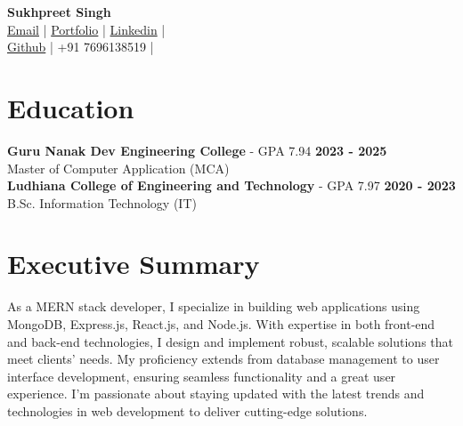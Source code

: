 \documentclass[letterpaper, 8pt]{article}
\newcommand{\iconSpace}{\hspace{1px}}
\newcommand{\secStartSpace}{\vspace{3pt}}
\newcommand{\secEndSpace}{\vspace{4pt}}
\newcommand{\spaceCollapse}{\vspace{-5pt}}
\begin{document}
\begin{center} 
	{\Large \textbf{Sukhpreet Singh}}\\
	\vspace{1px}
	{\footnotesize
		 \iconSpace \href{mailto:sukh.singhlotey@gmail.com}{Email} 
        |
		\iconSpace \href{https://sukhlotey.github.io/imSukhpreet/}{Portfolio}
        |
		\iconSpace \href{https://www.linkedin.com/in/sukhpreetlotey/}{Linkedin} 
        |
		}\\
	{\footnotesize
		\iconSpace \href{https://github.com/sukhlotey}{Github}
        |
		 \iconSpace
		+91 7696138519
        |		%
	}
\end{center}
\spaceCollapse


\section{\color{blue} \textbf{Education}}
\secStartSpace

\begin{addmargin}[1em]{1em}
\textbf{Guru Nanak Dev Engineering College} - GPA 7.94 \hfill \textbf{2023 - 2025}\\
        \setlength\parindent{1cm} Master of Computer Application (MCA)\\
	\textbf{Ludhiana College of Engineering and Technology} - GPA 7.97 \hfill \textbf{2020 - 2023}\\
	\setlength\parindent{1cm} B.Sc. Information Technology (IT)\\
\end{addmargin}
\secEndSpace


\section{\color{blue} \textbf{Executive Summary}}
\secStartSpace
As a MERN stack developer, I specialize in building web applications using MongoDB, Express.js, React.js, and Node.js. With expertise in both front-end and back-end technologies, I design and implement robust, scalable solutions that meet clients' needs. My proficiency extends from database management to user interface development, ensuring seamless functionality and a great user experience. I'm passionate about staying updated with the latest trends and technologies in web development to deliver cutting-edge solutions.
\newline
\secEndSpace
\end{document}
